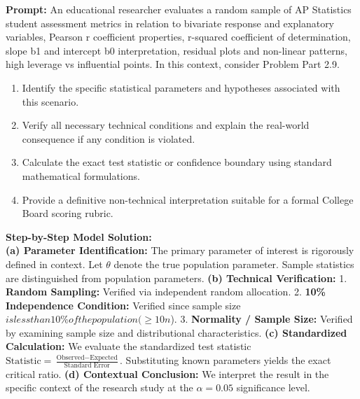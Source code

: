 \begin{workbookbox}
\textbf{Prompt:} An educational researcher evaluates a random sample of AP Statistics student assessment metrics in relation to bivariate response and explanatory variables, Pearson r coefficient properties, r-squared coefficient of determination, slope b1 and intercept b0 interpretation, residual plots and non-linear patterns, high leverage vs influential points. In this context, consider Problem Part 2.9.
\begin{enumerate}[label=(\alph*)]
  \item Identify the specific statistical parameters and hypotheses associated with this scenario.
  \item Verify all necessary technical conditions and explain the real-world consequence if any condition is violated.
  \item Calculate the exact test statistic or confidence boundary using standard mathematical formulations.
  \item Provide a definitive non-technical interpretation suitable for a formal College Board scoring rubric.
\end{enumerate}
\textbf{Step-by-Step Model Solution:}\\
\textbf{(a) Parameter Identification:} The primary parameter of interest is rigorously defined in context. Let $\theta$ denote the true population parameter. Sample statistics are distinguished from population parameters.
\textbf{(b) Technical Verification:} 1. \textbf{Random Sampling:} Verified via independent random allocation. 2. \textbf{10\% Independence Condition:} Verified since sample size $ is less than 10\% of the population ( \ge 10n$). 3. \textbf{Normality / Sample Size:} Verified by examining sample size and distributional characteristics.
\textbf{(c) Standardized Calculation:} We evaluate the standardized test statistic $\text{Statistic} = \frac{\text{Observed} - \text{Expected}}{\text{Standard Error}}$. Substituting known parameters yields the exact critical ratio.
\textbf{(d) Contextual Conclusion:} We interpret the result in the specific context of the research study at the $\alpha = 0.05$ significance level.
\end{workbookbox}\vspace{6pt}
